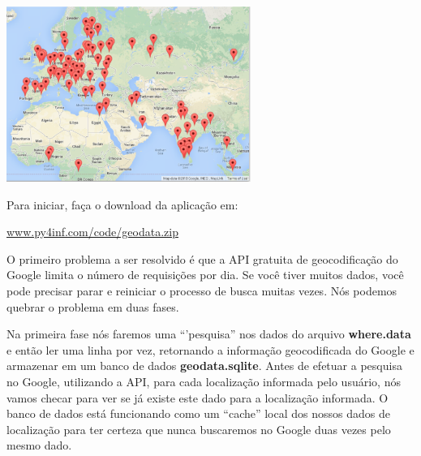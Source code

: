 \beforefig
\centerline{\includegraphics[height=2.25in]{figs2/google-map.eps}}
\afterfig

Para iniciar, faça o download da aplicação em:

\url{www.py4inf.com/code/geodata.zip}

O primeiro problema a ser resolvido é que a API gratuita de 
geocodificação do Google limita o número de requisições por dia.
Se você tiver muitos dados, você pode precisar parar e reiniciar
o processo de busca muitas vezes. Nós podemos quebrar o problema
em duas fases.

Na primeira fase nós faremos uma ``'pesquisa'' nos dados do arquivo
{\bf where.data} e então ler uma linha por vez, retornando a informação
geocodificada do Google e armazenar em um banco de dados {\bf geodata.sqlite}.
Antes de efetuar a pesquisa no Google, utilizando a API, para cada localização
informada pelo usuário, nós vamos checar para ver se já existe este dado
para a localização informada. O banco de dados está funcionando como um
``cache'' local dos nossos dados de localização para ter certeza que nunca
buscaremos no Google duas vezes pelo mesmo dado.

